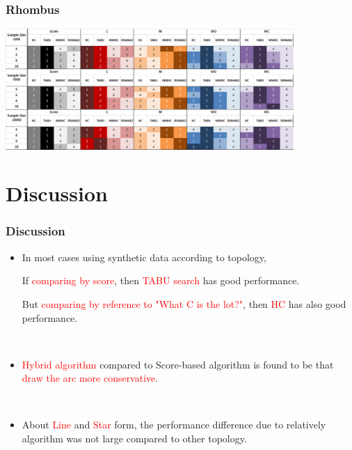 \documentclass{beamer}
\begin{document}
\begin{frame}
\frametitle{Rhombus}
{\scriptsize{}
	\begin{center}
		\includegraphics[height=130pt]{images/Result_Rhombus}
	\end{center}
}
\end{frame}



\section{Discussion}
\begin{frame}
\frametitle{Discussion}
{\scriptsize{}
	\begin{itemize}
	\item In most cases using synthetic data according to topology,
	
	If \textcolor{red}{comparing by score}, then \textcolor{red}{TABU search} has good performance.
	
	But \textcolor{red}{comparing by reference to "What C is the lot?"}, then \textcolor{red}{HC} has also good performance.
	
	{}\	
	
	\item \textcolor{red}{Hybrid algorithm} compared to Score-based algorithm is found to be that \textcolor{red}{draw the arc more conservative}.

	{}\

	\item About  \textcolor{red}{Line} and  \textcolor{red}{Star} form, the performance difference due to relatively algorithm was not large compared to other topology.
	\end{itemize}
}
\end{frame}
\end{document}
